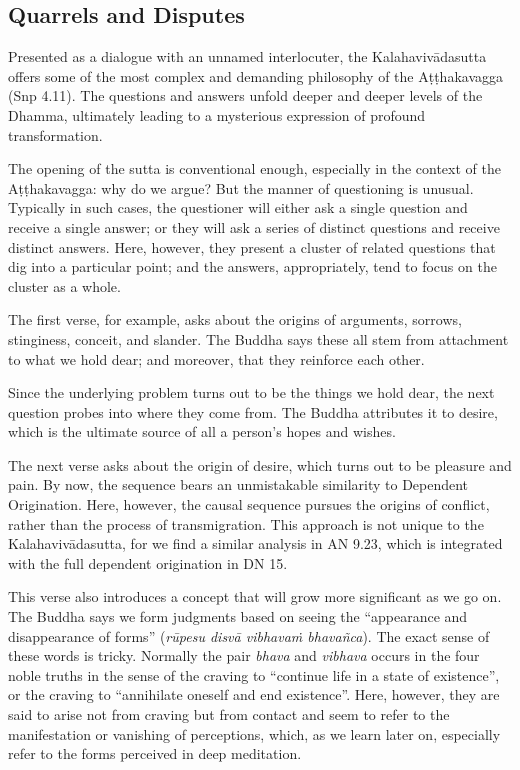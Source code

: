 \documentclass[12pt,openany]{book}%
\begin{document}
\subsection*{Quarrels and Disputes}

Presented as a dialogue with an unnamed interlocuter, the \textsanskrit{Kalahavivādasutta} offers some of the most complex and demanding philosophy of the \textsanskrit{Aṭṭhakavagga} (Snp 4.11). The questions and answers unfold deeper and deeper levels of the Dhamma, ultimately leading to a mysterious expression of profound transformation.

The opening of the sutta is conventional enough, especially in the context of the \textsanskrit{Aṭṭhakavagga}: why do we argue? But the manner of questioning is unusual. Typically in such cases, the questioner will either ask a single question and receive a single answer; or they will ask a series of distinct questions and receive distinct answers. Here, however, they present a cluster of related questions that dig into a particular point; and the answers, appropriately, tend to focus on the cluster as a whole.

The first verse, for example, asks about the origins of arguments, sorrows, stinginess, conceit, and slander. The Buddha says these all stem from attachment to what we hold dear; and moreover, that they reinforce each other.

Since the underlying problem turns out to be the things we hold dear, the next question probes into where they come from. The Buddha attributes it to desire, which is the ultimate source of all a person’s hopes and wishes.

The next verse asks about the origin of desire, which turns out to be pleasure and pain. By now, the sequence bears an unmistakable similarity to Dependent Origination. Here, however, the causal sequence pursues the origins of conflict, rather than the process of transmigration. This approach is not unique to the \textsanskrit{Kalahavivādasutta}, for we find a similar analysis in AN 9.23, which is integrated with the full dependent origination in DN 15.

This verse also introduces a concept that will grow more significant as we go on. The Buddha says we form judgments based on seeing the “appearance and disappearance of forms” (\textit{\textsanskrit{rūpesu} \textsanskrit{disvā} \textsanskrit{vibhavaṁ} \textsanskrit{bhavañca}}). The exact sense of these words is tricky. Normally the pair \textit{bhava} and \textit{vibhava} occurs in the four noble truths in the sense of the craving to “continue life in a state of existence”, or the craving to “annihilate oneself and end existence”. Here, however, they are said to arise not from craving but from contact and seem to refer to the manifestation or vanishing of perceptions, which, as we learn later on, especially refer to the forms perceived in deep meditation.
\end{document}
